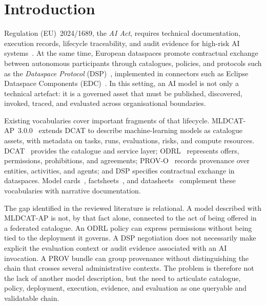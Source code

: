 \documentclass[Afour,sagev,times]{sagej}
\begin{document}
\maketitle

\section{Introduction}\label{sec:intro}

Regulation (EU)~2024/1689, the \emph{AI Act}, requires technical documentation, execution records, lifecycle traceability, and audit evidence for high-risk AI systems~\cite{aiact}. At the same time, European dataspaces promote contractual exchange between autonomous participants through catalogues, policies, and protocols such as the \emph{Dataspace Protocol} (DSP)~\cite{dsp}, implemented in connectors such as Eclipse Dataspace Components (EDC)~\cite{edc}. In this setting, an AI model is not only a technical artefact: it is a governed asset that must be published, discovered, invoked, traced, and evaluated across organisational boundaries.

Existing vocabularies cover important fragments of that lifecycle. MLDCAT-AP~3.0.0~\cite{mldcatap} extends DCAT to describe machine-learning models as catalogue assets, with metadata on tasks, runs, evaluations, risks, and compute resources. DCAT~\cite{dcat2} provides the catalogue and service layer; ODRL~\cite{odrl22} represents offers, permissions, prohibitions, and agreements; PROV-O~\cite{provo} records provenance over entities, activities, and agents; and DSP specifies contractual exchange in dataspaces. Model cards~\cite{mitchell19}, factsheets~\cite{arnold19}, and datasheets~\cite{gebru21} complement these vocabularies with narrative documentation.

The gap identified in the reviewed literature is relational. A model described with MLDCAT-AP is not, by that fact alone, connected to the act of being offered in a federated catalogue. An ODRL policy can express permissions without being tied to the deployment it governs. A DSP negotiation does not necessarily make explicit the evaluation context or audit evidence associated with an AI invocation. A PROV bundle can group provenance without distinguishing the chain that crosses several administrative contexts. The problem is therefore not the lack of another model description, but the need to articulate catalogue, policy, deployment, execution, evidence, and evaluation as one queryable and validatable chain.
\end{document}
